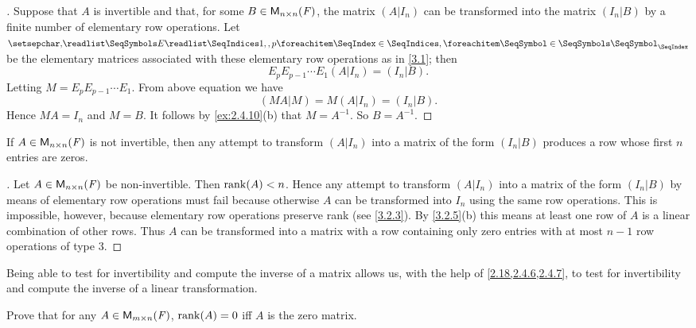 \begin{proof}[]
	Suppose that \(A\) is invertible and that, for some \(B \in \mathsf{M}_{{n} \times n}({\mathit{F}})\), the matrix \((A | I_n)\) can be transformed into the matrix \((I_n | B)\) by a finite number of elementary row operations.
	Let \(\seq{E}{1,,p}\) be the elementary matrices associated with these elementary row operations as in \cref{3.1};
	then
	\[
		E_p E_{p - 1} \cdots E_1 (A | I_n) = (I_n | B).
	\]
	Letting \(M = E_p E_{p - 1} \cdots E_1\).
	From above equation we have
	\[
		(MA | M) = M (A | I_n) = (I_n | B).
	\]
	Hence \(MA = I_n\) and \(M = B\).
	It follows by \cref{ex:2.4.10}(b) that \(M = A^{-1}\).
	So \(B = A^{-1}\).
\end{proof}

\begin{cor}\label{3.2.10}
	If \(A \in \mathsf{M}_{{n} \times n}({\mathit{F}})\) is not invertible, then any attempt to transform \((A | I_n)\) into a matrix of the form \((I_n | B)\) produces a row whose first \(n\) entries are zeros.
\end{cor}

\begin{proof}[]
	Let \(A \in \mathsf{M}_{{n} \times n}({\mathit{F}})\) be non-invertible.
	Then \(\rk{A} < n\).
	Hence any attempt to transform \((A | I_n)\) into a matrix of the form \((I_n | B)\) by means of elementary row operations must fail because otherwise \(A\) can be transformed into \(I_n\) using the same row operations.
	This is impossible, however, because elementary row operations preserve rank
	(see \cref{3.2.3}).
	By \cref{3.2.5}(b) this means at least one row of \(A\) is a linear combination of other rows.
	Thus \(A\) can be transformed into a matrix with a row containing only zero entries with at most \(n - 1\) row operations of type 3.
\end{proof}

\begin{note}
	Being able to test for invertibility and compute the inverse of a matrix allows us, with the help of \cref{2.18,2.4.6,2.4.7}, to test for invertibility and compute the inverse of a linear transformation.
\end{note}

\exercisesection

\setcounter{ex}{2}
\begin{ex}\label{ex:3.2.3}
	Prove that for any \(A \in \mathsf{M}_{{m} \times n}({\mathit{F}})\), \(\rk{A} = 0\) iff \(A\) is the zero matrix.
\end{ex}

